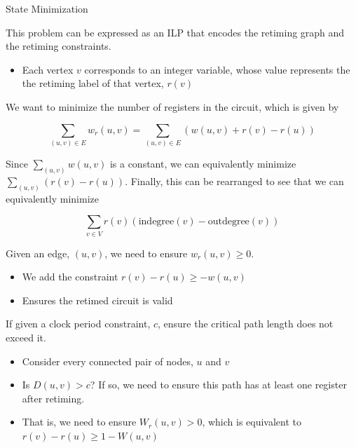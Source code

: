 \begin{frame}[allowframebreaks]{State Minimization}

  This problem can be expressed as an ILP that encodes the retiming graph and the retiming constraints.

  \begin{itemize}
    \item Each vertex $v$ corresponds to an integer variable, whose value represents the the retiming label of that vertex, $r(v)$
  \end{itemize}


  We want to minimize the number of registers in the circuit, which is given by

  $$\sum_{(u, v) \in E} w_r(u, v) = \sum_{(u, v) \in E} (w(u, v) + r(v) - r(u))$$

  Since $\sum_{(u,v)} w(u, v)$ is a constant, we can equivalently minimize $\sum_{(u, v)} (r(v) - r(u))$. Finally, this can be rearranged to see that we can equivalently minimize

  $$\sum_{v \in V} r(v) (\text{indegree}(v) - \text{outdegree}(v))$$

  \framebreak


  Given an edge, $(u, v)$, we need to ensure $w_r(u, v) \geq 0$.
  \begin{itemize}
    \item We add the constraint $r(v) - r(u) \geq -w(u, v)$
    \item Ensures the retimed circuit is valid
  \end{itemize}


  If given a clock period constraint, $c$, ensure the critical path length does not exceed it.
  
  \begin{itemize}
    \item Consider every connected pair of nodes, $u$ and $v$
    \item Is $D(u, v) > c$? If so, we need to ensure this path has at least one register after retiming.
    \item That is, we need to ensure $W_r(u, v) > 0$, which is equivalent to $r(v) - r(u) \geq 1-W(u, v)$
  \end{itemize}

\end{frame}